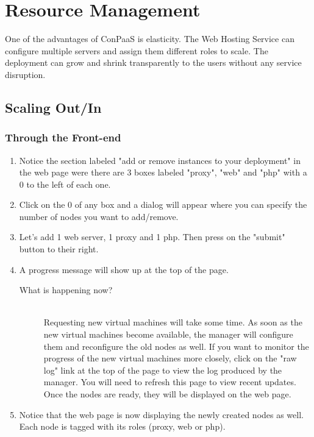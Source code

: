 \documentclass[10pt]{article}
\newenvironment{what}
{\begin{description} \item [What is happening now?] \hfill \\}
{\end{description}}
\begin{document}
\section{Resource Management}
One of the advantages of ConPaaS is elasticity. The Web Hosting Service can
configure multiple servers and assign them different roles to scale. The
deployment can grow and shrink transparently to the users without any
service disruption.

\subsection{Scaling Out/In}
\subsubsection{Through the Front-end}
\begin{enumerate}
\item Notice the section labeled "add or remove instances to your deployment" in
      the web page were there are 3 boxes labeled "proxy", "web" and "php" with
      a 0 to the left of each one.
\item Click on the 0 of any box and a dialog will appear where you can specify
the number of nodes you want to add/remove.
\item Let's add 1 web server, 1 proxy and 1 php. Then press on the "submit"
      button to their right.
\item A progress message will show up at the top of the page.
 \begin{what}
  Requesting new virtual machines will take some time. As soon as the new
  virtual machines become available, the manager will configure them and
  reconfigure the old nodes as well. If you want to monitor the progress of the
  new virtual machines more closely, click on the "raw log" link at the top of
  the page to view the log produced by the manager. You will need to refresh
  this page to view recent updates. Once the nodes are ready, they will be
  displayed on the web page.
 \end{what}
\item Notice that the web page is now displaying the newly created nodes as
      well. Each node is tagged with its roles (proxy, web or php).
\end{enumerate}
\end{document}
